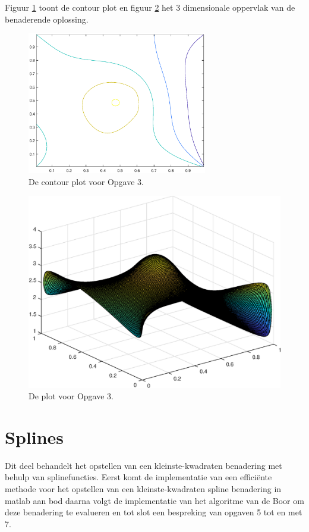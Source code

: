 \documentclass[a4paper]{article}
\begin{document}
Figuur \ref{fig:Contour3} toont de contour plot en figuur \ref{fig:Plot3} het 3 dimensionale oppervlak van de benaderende oplossing.
\newpage
\begin{figure}[H]
	\begin{center} 
		\includegraphics[width=0.7\textwidth]{Contour3.eps}
	\end{center}
	\caption{De contour plot voor Opgave 3.}
	\label{fig:Contour3}
\end{figure}

\begin{figure}[H]
	\begin{center} 
		\includegraphics[width=1\textwidth]{Plot3.eps}
	\end{center}
	\caption{De plot voor Opgave 3.}
	\label{fig:Plot3}
\end{figure}
\newpage

\section{Splines}\label{sec:splines}
Dit deel behandelt het opstellen van een kleinste-kwadraten benadering met behulp van splinefuncties. Eerst komt de implementatie van een effici\"ente methode voor het opstellen van een kleinste-kwadraten spline benadering in matlab aan bod daarna volgt de implementatie van het algoritme van de Boor om deze benadering te evalueren en tot slot een bespreking van opgaven 5 tot en met 7.
\end{document}

